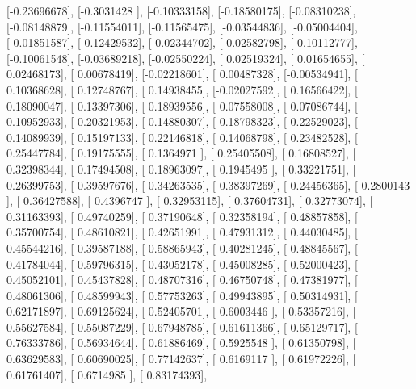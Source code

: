 \documentclass{article}
\begin{document}
       [-0.23696678],
       [-0.3031428 ],
       [-0.10333158],
       [-0.18580175],
       [-0.08310238],
       [-0.08148879],
       [-0.11554011],
       [-0.11565475],
       [-0.03544836],
       [-0.05004404],
       [-0.01851587],
       [-0.12429532],
       [-0.02344702],
       [-0.02582798],
       [-0.10112777],
       [-0.10061548],
       [-0.03689218],
       [-0.02550224],
       [ 0.02519324],
       [ 0.01654655],
       [ 0.02468173],
       [ 0.00678419],
       [-0.02218601],
       [ 0.00487328],
       [-0.00534941],
       [ 0.10368628],
       [ 0.12748767],
       [ 0.14938455],
       [-0.02027592],
       [ 0.16566422],
       [ 0.18090047],
       [ 0.13397306],
       [ 0.18939556],
       [ 0.07558008],
       [ 0.07086744],
       [ 0.10952933],
       [ 0.20321953],
       [ 0.14880307],
       [ 0.18798323],
       [ 0.22529023],
       [ 0.14089939],
       [ 0.15197133],
       [ 0.22146818],
       [ 0.14068798],
       [ 0.23482528],
       [ 0.25447784],
       [ 0.19175555],
       [ 0.1364971 ],
       [ 0.25405508],
       [ 0.16808527],
       [ 0.32398344],
       [ 0.17494508],
       [ 0.18963097],
       [ 0.1945495 ],
       [ 0.33221751],
       [ 0.26399753],
       [ 0.39597676],
       [ 0.34263535],
       [ 0.38397269],
       [ 0.24456365],
       [ 0.2800143 ],
       [ 0.36427588],
       [ 0.4396747 ],
       [ 0.32953115],
       [ 0.37604731],
       [ 0.32773074],
       [ 0.31163393],
       [ 0.49740259],
       [ 0.37190648],
       [ 0.32358194],
       [ 0.48857858],
       [ 0.35700754],
       [ 0.48610821],
       [ 0.42651991],
       [ 0.47931312],
       [ 0.44030485],
       [ 0.45544216],
       [ 0.39587188],
       [ 0.58865943],
       [ 0.40281245],
       [ 0.48845567],
       [ 0.41784044],
       [ 0.59796315],
       [ 0.43052178],
       [ 0.45008285],
       [ 0.52000423],
       [ 0.45052101],
       [ 0.45437828],
       [ 0.48707316],
       [ 0.46750748],
       [ 0.47381977],
       [ 0.48061306],
       [ 0.48599943],
       [ 0.57753263],
       [ 0.49943895],
       [ 0.50314931],
       [ 0.62171897],
       [ 0.69125624],
       [ 0.52405701],
       [ 0.6003446 ],
       [ 0.53357216],
       [ 0.55627584],
       [ 0.55087229],
       [ 0.67948785],
       [ 0.61611366],
       [ 0.65129717],
       [ 0.76333786],
       [ 0.56934644],
       [ 0.61886469],
       [ 0.5925548 ],
       [ 0.61350798],
       [ 0.63629583],
       [ 0.60690025],
       [ 0.77142637],
       [ 0.6169117 ],
       [ 0.61972226],
       [ 0.61761407],
       [ 0.6714985 ],
       [ 0.83174393],
\end{document}
